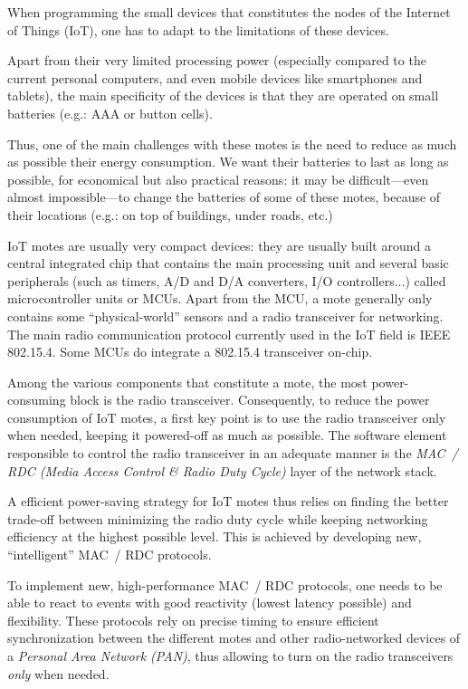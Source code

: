 \documentclass[a4paper,twoside]{article}
\begin{document}
When programming the small devices that constitutes the nodes of
the Internet of Things (IoT), one has to adapt to the limitations of
these devices.

Apart from their very limited processing power (especially compared to
the current personal computers, and even mobile devices like smartphones
and tablets), the main specificity of the devices is that they are operated
on small batteries (e.g.: AAA or button cells).

Thus, one of the main challenges with these motes is the need to reduce
as much as possible their energy consumption. We want their batteries to last
as long as possible, for economical but also practical reasons: it may be
difficult---even almost impossible---to change the batteries of some of these
motes, because of their locations (e.g.: on top of buildings, under roads,
etc.)

IoT motes are usually very compact devices: they are usually built around
a central integrated chip that contains the main processing unit and several
basic peripherals (such as timers, A/D and D/A converters, I/O controllers...)
called microcontroller units or MCUs. Apart from the MCU, a mote generally
only contains some ``physical-world'' sensors and a radio transceiver for
networking. The main radio communication protocol currently used in the IoT
field is IEEE 802.15.4. Some MCUs do integrate a 802.15.4 transceiver on-chip.

Among the various components that constitute a mote, the most power-consuming
block is the radio transceiver. Consequently, to reduce the power consumption
of IoT motes, a first key point is to use the radio transceiver only when
needed, keeping it powered-off as much as possible. The software element
responsible to control the radio transceiver in an adequate manner is
the \emph{MAC~/ RDC (Media Access Control \& Radio Duty Cycle)}
layer of the network stack.

A efficient power-saving strategy for IoT motes thus relies on finding the
better trade-off between minimizing the radio duty cycle while keeping
networking efficiency at the highest possible level. This is achieved
by developing new, ``intelligent'' MAC~/ RDC protocols.

To implement new, high-performance MAC~/ RDC protocols, one needs to be
able to react to events with good reactivity (lowest latency possible) and
flexibility. These protocols rely on precise timing to ensure efficient
synchronization between the different motes and other radio-networked
devices of a \emph{Personal Area Network (PAN)}, thus allowing
to turn on the radio transceivers \emph{only} when needed.
\end{document}
